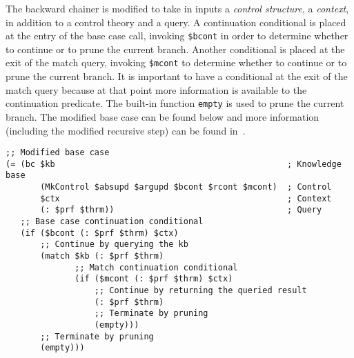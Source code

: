 \documentclass{easychair}
\begin{document}
The backward chainer is modified to take in inputs a \emph{control
structure}, a \emph{context}, in addition to a control theory and a
query.  A continuation conditional is placed at the entry of the base
case call, invoking \texttt{\$bcont} in order to determine whether to
continue or to prune the current branch.  Another conditional is
placed at the exit of the match query, invoking \texttt{\$mcont} to
determine whether to continue or to prune the current branch.  It is
important to have a conditional at the exit of the match query because
at that point more information is available to the continuation
predicate.  The built-in function \texttt{empty} is used to prune the
current branch.  The modified base case can be found below and more
information (including the modified recursive step) can be found
in~\cite{Geisweiller2024ICM}.  \small{
\begin{verbatim}
;; Modified base case
(= (bc $kb                                               ; Knowledge base
       (MkControl $absupd $argupd $bcont $rcont $mcont)  ; Control
       $ctx                                              ; Context
       (: $prf $thrm))                                   ; Query
   ;; Base case continuation conditional
   (if ($bcont (: $prf $thrm) $ctx)
       ;; Continue by querying the kb
       (match $kb (: $prf $thrm)
              ;; Match continuation conditional
              (if ($mcont (: $prf $thrm) $ctx)
                  ;; Continue by returning the queried result
                  (: $prf $thrm)
                  ;; Terminate by pruning
                  (empty)))
       ;; Terminate by pruning
       (empty)))
\end{verbatim}
}

\end{document}
